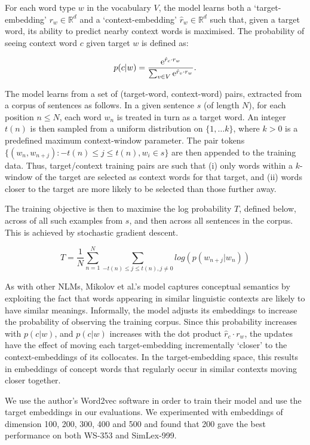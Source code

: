 For each word type \(w\) in the vocabulary \(V\), the model learns both a `target-embedding' \( r_{w} \in \mathbb{R}^d\) and a `context-embedding' \(\hat{r}_{w} \in \mathbb{R}^d\) such that, given a target word, its ability to predict nearby context words is maximised. The probability of seeing context word \(c\) given target \(w\) is defined as:  

\[p(c|w)  = \frac{\mathrm{e}^{\hat{r}_{c} \cdot r_{w}}}{\sum_{v \in V} \mathrm{e}^{\hat{r}_v\cdot r_{w}}}.\]

The model learns from a set of (target-word, context-word) pairs, extracted from a corpus of sentences as follows. In a given sentence \(s\) (of length \(N\)), for each position \( n \leq N\), each word \(w_n\) is treated in turn as a target word. An integer \( {t(n)} \) is then sampled from a uniform distribution on \( \{1, \dots k \} \), where \(k > 0\) is a predefined maximum context-window parameter. The pair tokens \( \{(w_n, w_{n+j}): -{t(n)}\leq j \leq {t(n)}, w_i \in s \}\) are then appended to the training data. Thus, target/context training pairs are such that (i) only words within a \(k\)-window of the target are selected as context words for that target, and (ii) words closer to the target are more likely to be selected than those further away.

The training objective is then to maximise the log probability \( T\), defined below, across of all such examples from \(s\), and then across all sentences in the corpus. This is achieved by stochastic gradient descent. 

\[ T = \frac{1}{N} \sum_{n=1}^{N} \sum_{-{t(n)}\leq j \leq {t(n)}, j\neq 0} log(  p(w_{n+j}|w_{n}) ) \]

As with other NLMs, Mikolov et al.'s model captures conceptual semantics by exploiting the fact that words appearing in similar linguistic contexts are likely to have similar meanings. Informally, the model adjusts its embeddings to increase the probability of observing the training corpus. Since this probability increases with \(p(c|w)\), and \(p(c|w)\) increases with the dot product \( \hat{r}_c\cdot r_{w} \), the updates have the effect of moving each target-embedding incrementally `closer' to the context-embeddings of its collocates. In the target-embedding space, this results in embeddings of concept words that regularly occur in similar contexts moving closer together.  

We use the author's Word2vec software in order to train their model and use the target embeddings in our evaluations. We experimented with embeddings of dimension 100, 200, 300, 400 and 500 and found that 200 gave the best performance on both WS-353 and SimLex-999. 

